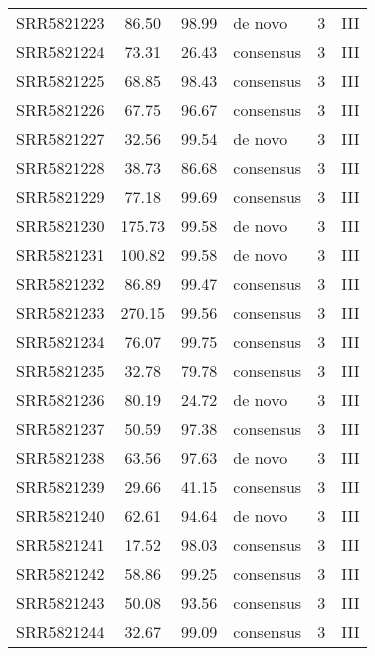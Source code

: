 \begin{scriptsize}
\begin{center}
\begin{longtable}{@{}lcclcc@{}}
SRR5821223 & 86.50         & 98.99       & de novo      & 3        & III      \\
SRR5821224 & 73.31         & 26.43       & consensus    & 3        & III      \\
SRR5821225 & 68.85         & 98.43       & consensus    & 3        & III      \\
SRR5821226 & 67.75         & 96.67       & consensus    & 3        & III      \\
SRR5821227 & 32.56         & 99.54       & de novo      & 3        & III      \\
SRR5821228 & 38.73         & 86.68       & consensus    & 3        & III      \\
SRR5821229 & 77.18         & 99.69       & consensus    & 3        & III      \\
SRR5821230 & 175.73        & 99.58       & de novo      & 3        & III      \\
SRR5821231 & 100.82        & 99.58       & de novo      & 3        & III      \\
SRR5821232 & 86.89         & 99.47       & consensus    & 3        & III      \\
SRR5821233 & 270.15        & 99.56       & consensus    & 3        & III      \\
SRR5821234 & 76.07         & 99.75       & consensus    & 3        & III      \\
SRR5821235 & 32.78         & 79.78       & consensus    & 3        & III      \\
SRR5821236 & 80.19         & 24.72       & de novo      & 3        & III      \\
SRR5821237 & 50.59         & 97.38       & consensus    & 3        & III      \\
SRR5821238 & 63.56         & 97.63       & de novo      & 3        & III      \\
SRR5821239 & 29.66         & 41.15       & consensus    & 3        & III      \\
SRR5821240 & 62.61         & 94.64       & de novo      & 3        & III      \\
SRR5821241 & 17.52         & 98.03       & consensus    & 3        & III      \\
SRR5821242 & 58.86         & 99.25       & consensus    & 3        & III      \\
SRR5821243 & 50.08         & 93.56       & consensus    & 3        & III      \\
SRR5821244 & 32.67         & 99.09       & consensus    & 3        & III      \\

\end{longtable}
\end{center}
\end{scriptsize}
